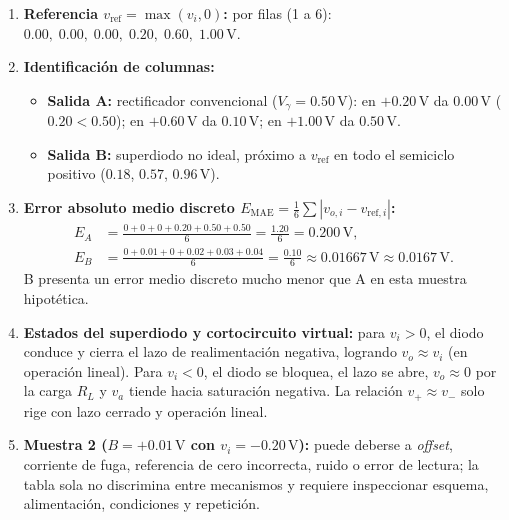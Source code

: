 \documentclass[10pt, a4paper]{article}
\begin{document}
\begin{enumerate}
    \setlength{\itemsep}{2pt}
    \item \textbf{Referencia $v_{\mathrm{ref}} = \max(v_i, 0)$:} por filas (1 a 6): $0.00,\; 0.00,\; 0.00,\; 0.20,\; 0.60,\; 1.00\,\mathrm{V}$.
    \item \textbf{Identificación de columnas:}
    \begin{itemize}
        \setlength{\itemsep}{1pt}
        \item \textbf{Salida A:} rectificador convencional ($V_\gamma = 0.50\,\mathrm{V}$): en $+0.20\,\mathrm{V}$ da $0.00\,\mathrm{V}$ ($0.20 < 0.50$); en $+0.60\,\mathrm{V}$ da $0.10\,\mathrm{V}$; en $+1.00\,\mathrm{V}$ da $0.50\,\mathrm{V}$.
        \item \textbf{Salida B:} superdiodo no ideal, próximo a $v_{\mathrm{ref}}$ en todo el semiciclo positivo ($0.18$, $0.57$, $0.96\,\mathrm{V}$).
    \end{itemize}
    \item \textbf{Error absoluto medio discreto $E_{\mathrm{MAE}} = \frac{1}{6}\sum |v_{o,i} - v_{\mathrm{ref},i}|$:}
    \begin{align}
        E_A &= \frac{0 + 0 + 0 + 0.20 + 0.50 + 0.50}{6} = \frac{1.20}{6} = 0.200\,\mathrm{V}, \\
        E_B &= \frac{0 + 0.01 + 0 + 0.02 + 0.03 + 0.04}{6} = \frac{0.10}{6} \approx 0.01667\,\mathrm{V} \approx 0.0167\,\mathrm{V}.
    \end{align}
    B presenta un error medio discreto mucho menor que A en esta muestra hipotética.
    \item \textbf{Estados del superdiodo y cortocircuito virtual:} para $v_i > 0$, el diodo conduce y cierra el lazo de realimentación negativa, logrando $v_o \approx v_i$ (en operación lineal). Para $v_i < 0$, el diodo se bloquea, el lazo se abre, $v_o \approx 0$ por la carga $R_L$ y $v_a$ tiende hacia saturación negativa. La relación $v_+ \approx v_-$ solo rige con lazo cerrado y operación lineal.
    \item \textbf{Muestra 2 ($B = +0.01\,\mathrm{V}$ con $v_i = -0.20\,\mathrm{V}$):} puede deberse a \textit{offset}, corriente de fuga, referencia de cero incorrecta, ruido o error de lectura; la tabla sola no discrimina entre mecanismos y requiere inspeccionar esquema, alimentación, condiciones y repetición.
\end{enumerate}
\end{document}
